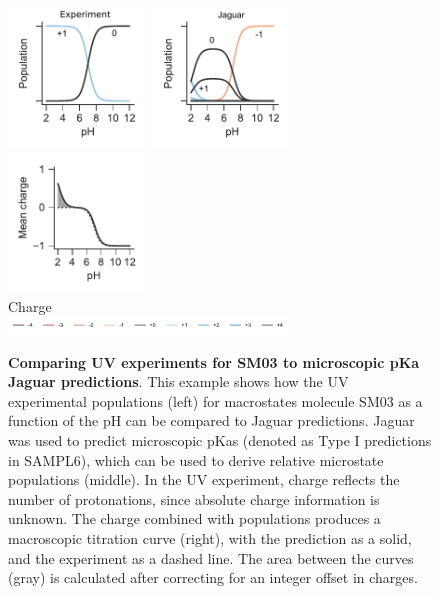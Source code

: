 \documentclass[9pt,lineno,final]{elife}
\begin{document}
\begin{figure}[H]
	\centering
	\includegraphics[width=0.33\textwidth]{Reports/Experiment-populations-SM03-titled.pdf}
	\includegraphics[width=0.33\textwidth]{Reports/Jaguar-pKa-populations-SM03-titled.pdf}
	\includegraphics[width=0.33\textwidth]{Reports/Jaguar-pKa-virtual-titration-SM03.pdf}\\
	Charge \\
	\includegraphics[width=0.66\textwidth, trim={2cm 0 2cm 0},clip]{Reports/overview-charge-legend-SM03.pdf}
		\caption{{\bf Comparing UV experiments for SM03 to microscopic pKa Jaguar predictions}. This example shows how the UV experimental populations (left) for macrostates molecule SM03 as a function of the pH can be compared to Jaguar predictions. Jaguar was used to predict microscopic pKas (denoted as Type I predictions in SAMPL6), which can be used to derive relative microstate populations (middle). In the UV experiment, charge reflects the number of protonations, since absolute charge information is unknown. The charge combined with populations produces a macroscopic titration curve (right), with the prediction as a solid, and the experiment as a dashed line. The area between the curves (gray) is calculated after correcting for an integer offset in charges.
	\label{fig:jaguar-prediction}}
\end{figure}
\end{document}
